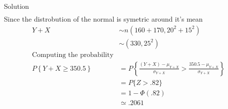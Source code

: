 \documentclass{article}
\begin{document}
\begin{spacing}{1.1}
\begin{homeworkProblem}
\begin{enumerate}[(a)]
\begin{homeworkSection}{Solution}
\begin{align*}
        \end{align*}
          Since the distrobution of the normal
          is symetric around it's mean
        \begin{align*}
          Y + X &\sim n( 160 + 170, 20^2 + 15^2)\\
          &\sim( 330, 25^2)\\
          \text{Computing the probability}\\
          P\left\{ Y + X \ge 350.5\right\} 
          &= P\left\{ \frac{ (Y + X) - \mu_{Y + X}}{ \sigma_{Y + X}}
            > \frac{ 350.5 - \mu_{Y + X}}{ \sigma_{Y + X}}\right\}\\
          &= P\{ Z > .82 \}\\
          &= 1 - \Phi(.82)\\
          &\simeq .2061\\
        \end{align*}
      \end{homeworkSection}
  \end{enumerate}
\end{homeworkProblem}

\end{spacing}
\end{document}
